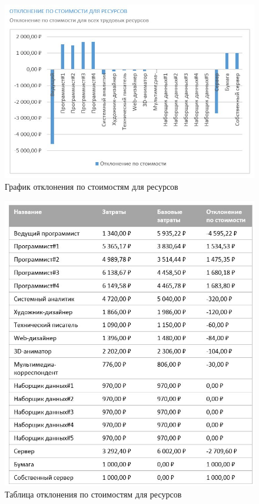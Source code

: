 \begin{figure}[H]
	\begin{center}
		\includegraphics[scale=0.5]{inc/img/resource-graph.jpg}
	\end{center}
	\captionsetup{justification=centering}
	\caption{График отклонения по стоимостям для ресурсов}
	\label{img:resource-graph}
\end{figure}

\begin{figure}[H]
	\begin{center}
		\includegraphics[scale=0.4]{inc/img/resource-table.jpg}
	\end{center}
	\captionsetup{justification=centering}
	\caption{Таблица отклонения по стоимостям для ресурсов}
	\label{img:resource-table}
\end{figure}
 
